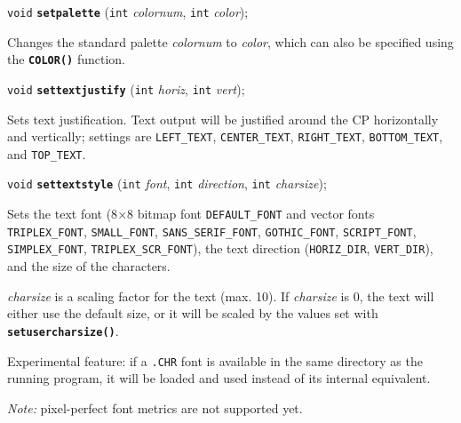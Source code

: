 \documentclass[a4paper,12pt]{article}
\newcommand{\V}{\texttt{void}}      %
\newcommand{\I}{\texttt{int}}       %
\newcommand{\func}[1]{\textbf{\texttt{#1}}}  %
\newcommand{\A}[1]{\emph{#1}}       %
\newcommand{\T}[1]{\texttt{#1}}     %
\newcommand{\file}[1]{\texttt{#1}}
\newenvironment{bgi}
{ %
  \begin{snugshade}
}
{ %
  \end{snugshade}
}
\begin{document}

\label{sec:setpalette}

\begin{bgi}
\V{} \func{setpalette} (\I{} \A{colornum}, \I{} \A{color});
\end{bgi}

Changes the standard palette \A{colornum} to \A{color}, which can also
be specified using the \func{COLOR()} function.


\label{sec:settextjustify}

\begin{bgi}
\V{} \func{settextjustify} (\I{} \A{horiz}, \I{} \A{vert});
\end{bgi}

Sets text justification. Text output will be justified around the CP
horizontally and vertically; settings are \T{LEFT\_TEXT},
\T{CENTER\_TEXT}, \T{RIGHT\-\_TEXT}, \T{BOTTOM\_TEXT}, and
\T{TOP\_TEXT}.


\label{sec:settextstyle}

\begin{bgi}
\V{} \func{settextstyle} (\I{} \A{font}, \I{} \A{direction}, \I{}
\A{charsize});
\end{bgi}

Sets the text font (8$\times$8 bitmap font \T{DEFAULT\_FONT} and
vector fonts \T{TRIPLEX\_FONT}, \T{SMALL\-\_FONT},
\T{SANS\_SERIF\_FONT}, \T{GOTHIC\_FONT}, \T{SCRIPT\_FONT},
\T{SIMPLEX\_FONT}, \T{TRI\-PLEX\_SCR\_FONT}), the text direction
(\T{HORIZ\_DIR}, \T{VERT\_DIR}), and the size of the characters.

\A{charsize} is a scaling factor for the text (max. 10). If
\A{charsize} is 0, the text will either use the default size, or it
will be scaled by the values set with \func{setusercharsize()}.

Experimental feature: if a \file{.CHR} font is available in the same
directory as the running program, it will be loaded and used instead
of its internal equivalent.

\emph{Note:} pixel-perfect font metrics are not supported yet.


\label{sec:setusercharsize}
\end{document}
